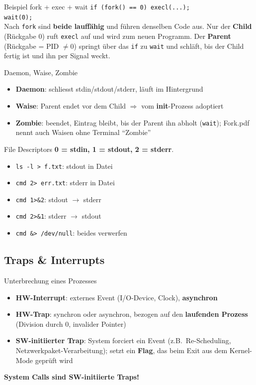 \documentclass[a4paper, fontsize=7pt]{scrartcl}
\begin{document}
\begin{subbox}{Beispiel fork + exec + wait}
\texttt{if (fork() == 0) execl(...);}\\
\texttt{wait(0);}\\
Nach \texttt{fork} sind \textbf{beide lauffähig} und führen denselben Code
aus. Nur der \textbf{Child} (Rückgabe 0) ruft \texttt{execl} auf und wird
zum neuen Programm. Der \textbf{Parent} (Rückgabe = PID $\neq 0$) springt
über das \texttt{if} zu \texttt{wait} und schläft, bis der Child fertig
ist und ihn per Signal weckt.
\end{subbox}

\begin{subbox}{Daemon, Waise, Zombie}
\begin{itemize}
    \item \textbf{Daemon}: schliesst stdin/stdout/stderr, läuft im
          Hintergrund
    \item \textbf{Waise}: Parent endet vor dem Child $\Rightarrow$ vom
          \textbf{init}-Prozess adoptiert
    \item \textbf{Zombie}: beendet, Eintrag bleibt, bis der Parent ihn
          abholt (\texttt{wait}); Fork.pdf nennt auch Waisen ohne
          Terminal ``Zombie''
\end{itemize}
\end{subbox}

\begin{subbox}{File Descriptors}
\textbf{0 = stdin, 1 = stdout, 2 = stderr}.
\begin{itemize}
    \item \texttt{ls -l > f.txt}: stdout in Datei
    \item \texttt{cmd 2> err.txt}: stderr in Datei
    \item \texttt{cmd 1>\&2}: stdout $\to$ stderr
    \item \texttt{cmd 2>\&1}: stderr $\to$ stdout
    \item \texttt{cmd \&> /dev/null}: beides verwerfen
\end{itemize}
\end{subbox}

\subsection{Traps \& Interrupts}

\begin{mainbox}{Unterbrechung eines Prozesses}
\begin{itemize}
    \item \textbf{HW-Interrupt}: externes Event (I/O-Device, Clock),
          \textbf{asynchron}
    \item \textbf{HW-Trap}: synchron oder asynchron, bezogen auf den
          \textbf{laufenden Prozess} (Division durch 0, invalider Pointer)
    \item \textbf{SW-initiierter Trap}: System forciert ein Event (z.B.\
          Re-Scheduling, Netzwerkpaket-Verarbeitung); setzt ein
          \textbf{Flag}, das beim Exit aus dem Kernel-Mode geprüft wird
\end{itemize}
\textbf{System Calls sind SW-initiierte Traps!}
\end{mainbox}
\end{document}
